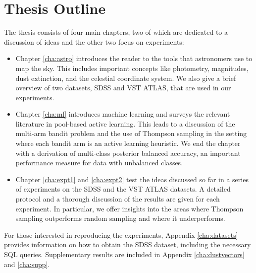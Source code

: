 \section{Thesis Outline}
\label{sec:orgnisation}

The thesis consists of four main chapters, two of which are dedicated to a discussion of ideas and
the other two focus on experiments:
	\begin{itemize}
		\item Chapter \ref{cha:astro} introduces the reader to the tools that astronomers use
		to map the sky. This includes important concepts like photometry, magnitudes, dust
		extinction, and the celestial coordinate system. We also give a brief overview of
		two datasets, SDSS and VST ATLAS, that are used in our experiments.
		
		\item Chapter \ref{cha:ml} introduces machine learning and surveys the relevant literature
		in pool-based active learning. This leads to a discussion of the multi-arm bandit problem
		and the use of Thompson sampling in the setting where each bandit arm is an active learning
		heuristic. We end the chapter with a derivation of multi-class posterior balanced accuracy,
		an important performance measure for data with unbalanced classes.
		
		\item Chapter \ref{cha:expt1} and \ref{cha:expt2} test the ideas discussed so far in a
		series of experiments on the SDSS and the VST ATLAS datasets. A detailed protocol and a
		thorough discussion of the results are given for each experiment. In particular, we offer
		insights into the areas where Thompson sampling outperforms random sampling and where it
		underperforms. 
	\end{itemize}
For those interested in reproducing the experiments, Appendix \ref{cha:datasets} provides
information on how to obtain the SDSS dataset, including the necessary SQL queries. Supplementary
results are included in Appendix \ref{cha:dustvectors} and \ref{cha:supp}.

